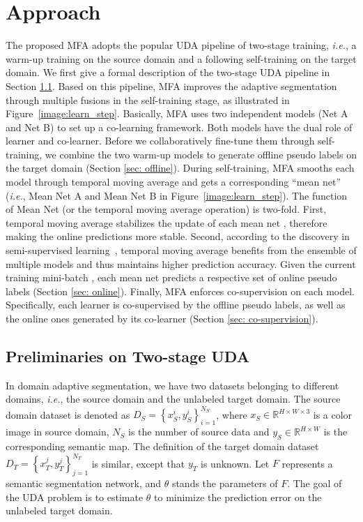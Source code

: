\documentclass{bmvc2k}
\begin{document}
\section{Approach}
The proposed MFA adopts the popular UDA pipeline of two-stage training, \emph{i.e.}, a warm-up training on the source domain and a following self-training on the target domain. We first give a formal description of the two-stage UDA pipeline in Section \ref{sec: pre}.
Based on this pipeline, MFA improves the adaptive segmentation through multiple fusions in the self-training stage, as illustrated in Figure~\ref{image:learn_step}. Basically, MFA uses two independent models (Net A and Net B) to set up a co-learning framework. Both models have the dual role of learner and co-learner. Before we collaboratively fine-tune them through self-training, we combine the two warm-up models to generate offline pseudo labels on the target domain (Section \ref{sec: offline}). During self-training, MFA smooths each model through temporal moving average and gets a corresponding ``mean net'' (\emph{i.e.}, Mean Net A and Mean Net B in Figure~\ref{image:learn_step}).  The function of Mean Net (or the temporal moving average operation) is two-fold. First, temporal moving average stabilizes the update of each mean net , therefore making the online predictions more stable. Second, according to the discovery in semi-supervised learning~\cite{tarvainen2017mean}, temporal moving average benefits from the ensemble of multiple models and thus maintains higher prediction accuracy. Given the current training mini-batch , each mean net predicts a respective set of online pseudo labels (Section \ref{sec: online}). Finally, MFA enforces co-supervision on each model. Specifically, each learner is co-supervised by the offline pseudo labels, as well as the online ones generated by its co-learner (Section \ref{sec: co-supervision}).


\subsection{Preliminaries on Two-stage UDA} \label{sec: pre}
In domain adaptive segmentation, we have two datasets belonging to different domains, \emph{i.e.}, the source domain and the unlabeled target domain. The source domain dataset is denoted as $D_{S}=\left \{ x_{S}^{i}, y_{S}^{i} \right \}_{i=1}^{N_{S}}$, where $x_{S}\in\mathbb{R}^{H \times W \times 3}$ is a color image in source domain, $N_{S}$ is the number of source data and $y_{S} \in \mathbb{R}^{H \times W}$ is the corresponding semantic map. The definition of the target domain dataset $D_{T}=\left \{ x_{T}^{j}, y_{T}^{j} \right \}_{j=1}^{N_{T}}$ is similar, except that $y_{T}$ is unknown. Let $F$ represents a semantic segmentation network, and $\theta$ stands the parameters of $F$. The goal of the UDA problem is to estimate $\theta$ to minimize the prediction error on the unlabeled target domain.  
\end{document}
